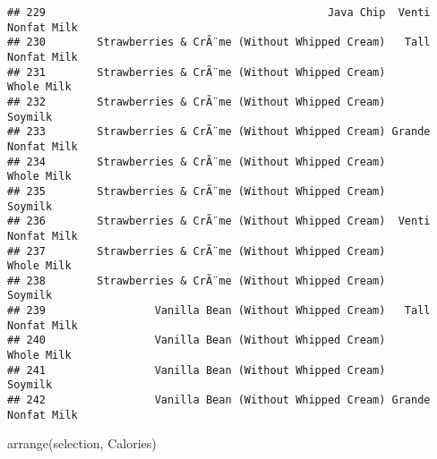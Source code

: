 \documentclass[
]{article}
\newenvironment{Shaded}{\begin{snugshade}}{\end{snugshade}}
\newcommand{\FunctionTok}[1]{\textcolor[rgb]{0.00,0.00,0.00}{#1}}
\newcommand{\NormalTok}[1]{#1}
\begin{document}
\begin{verbatim}
## 229                                            Java Chip  Venti Nonfat Milk
## 230        Strawberries & CrÃ¨me (Without Whipped Cream)   Tall Nonfat Milk
## 231        Strawberries & CrÃ¨me (Without Whipped Cream)         Whole Milk
## 232        Strawberries & CrÃ¨me (Without Whipped Cream)            Soymilk
## 233        Strawberries & CrÃ¨me (Without Whipped Cream) Grande Nonfat Milk
## 234        Strawberries & CrÃ¨me (Without Whipped Cream)         Whole Milk
## 235        Strawberries & CrÃ¨me (Without Whipped Cream)            Soymilk
## 236        Strawberries & CrÃ¨me (Without Whipped Cream)  Venti Nonfat Milk
## 237        Strawberries & CrÃ¨me (Without Whipped Cream)         Whole Milk
## 238        Strawberries & CrÃ¨me (Without Whipped Cream)            Soymilk
## 239                 Vanilla Bean (Without Whipped Cream)   Tall Nonfat Milk
## 240                 Vanilla Bean (Without Whipped Cream)         Whole Milk
## 241                 Vanilla Bean (Without Whipped Cream)            Soymilk
## 242                 Vanilla Bean (Without Whipped Cream) Grande Nonfat Milk
\end{verbatim}

\begin{Shaded}
\begin{Highlighting}[]
\FunctionTok{arrange}\NormalTok{(selection, Calories)}
\end{Highlighting}
\end{Shaded}
\end{document}
